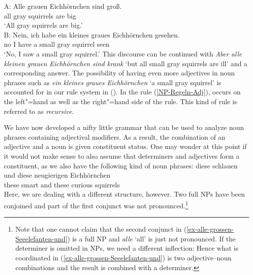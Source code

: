 \ea
\label{Beispiel-Iteration-Adjektive}
\gll A: Alle grauen Eichhörnchen sind groß.\\
\spacebr{} all gray squirrels are big\\
\glt \hphantom{A:~}`All gray squirrels are big.'\\
\gll B: Nein, ich habe ein kleines graues Eichhörnchen gesehen.\\
	\spacebr{} no I have a small gray squirrel seen\\
\glt \hphantom{B:~}`No, I saw a small gray squirrel.'
\z
This discourse can be continued with \emph{Aber alle kleinen grauen Eichhörnchen
  sind krank} `but all small gray squirrels are ill' and a corresponding answer. The possibility
  of having even more adjectives in noun phrases such as \emph{ein kleines graues Eichhörnchen} `a
  small gray squirrel' is accounted for in our rule system in (). In the rule
  (\ref{NP-Regeln-Adj}), \nbar occurs on the left"=hand as well as the right"=hand 
  side of the rule. This kind of rule is referred to as \emph{recursive}.

\largerpage
We have now developed a nifty little grammar that can be used to analyze noun phrases containing
adjectival modifiers. As a result, the combination of an adjective and a noun is given constituent
status. One may wonder at this point if it would not make sense to also assume that determiners and
adjectives form a constituent, as we also have the following kind of noun phrases: 
\ea
\gll diese schlauen und diese neugierigen Eichhörnchen\\
     these smart    and these curious     squirrels\\
\z
Here, we are dealing with a different structure, however. Two full NPs have been
conjoined and part of the first conjunct was not pronounced.\footnote{
  Note that one cannot claim that the second conjunct in (\ref{ex-alle-grossen-Seeelefanten-und}) is
  a full NP and \emph{alle} `all' is just not pronounced. If the determiner is omitted in 
  NPs, we need a different inflection:
\eal
{}
\zl
Hence what is coordinated in (\ref{ex-alle-grossen-Seeelefanten-und}) is two adjective--noun
combinations and the result is combined with a determiner.
}

